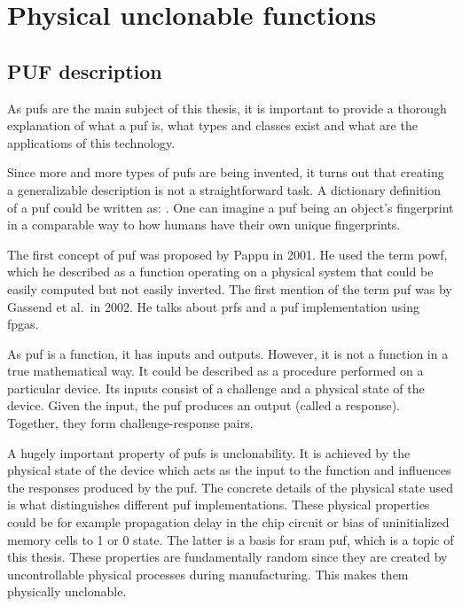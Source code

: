 \chapter{Physical unclonable functions}\label{sec:puf}

\section{PUF description}

As \glspl{puf} are the main subject of this thesis, it is important to provide a thorough explanation of what a \gls{puf} is, what types and classes exist and what are
the applications of this technology.

Since more and more types of \glspl{puf} are being invented, it turns out that creating a generalizable description is not a straightforward task. A dictionary definition of a \gls{puf} could be written as: . One can imagine a \gls{puf} being an object's fingerprint in a comparable way to how humans have their own unique fingerprints.~\cite{Maes2013}

The first concept of \gls{puf} was proposed by Pappu in 2001. He used the term \gls{powf}, which he described as a function operating on a physical system that could be easily computed but not easily inverted.\cite{Pappu2001} The first mention of the term \gls{puf} was by Gassend et al.\ in 2002. He talks about \glspl{prf} and a \gls{puf} implementation using \glspl{fpga}.~\cite{Gassend2002}

As \gls{puf} is a function, it has inputs and outputs. However, it is not a function in a true mathematical way. It could be described as a procedure performed on a particular device. Its inputs consist of a challenge and a physical state of the device. Given the input, the \gls{puf} produces an output (called a response). Together, they form challenge-response pairs.   

A hugely important property of \glspl{puf} is unclonability. It is achieved by the physical state of the device which acts as the input to the function and influences the responses produced by the \gls{puf}. The concrete details of the physical state used is what distinguishes different \gls{puf} implementations. These physical properties could be for example propagation delay in the chip circuit or bias of uninitialized memory cells to 1 or 0 state. The latter is a basis for \gls{sram} \gls{puf}, which is a topic of this thesis. These properties are fundamentally random since they are created by uncontrollable physical processes during manufacturing. This makes them physically unclonable.

